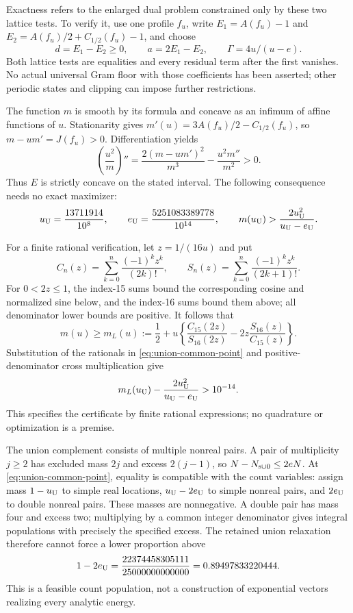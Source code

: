 \documentclass[11pt,reqno]{amsart}
\numberwithin{equation}{section}
\begin{document}
Exactness refers to the enlarged dual problem constrained only
by these two lattice tests. To verify it, use one profile $f_u$,
write $E_1=A(f_u)-1$ and
$E_2=A(f_u)/2+C_{1/2}(f_u)-1$, and choose
\[
 d=E_1-E_2\ge0,\qquad a=2E_1-E_2,\qquad
 \Gamma=4u/(u-e).
\]
Both lattice tests are equalities and every residual term after
the first vanishes. No actual universal Gram floor with those
coefficients has been asserted; other periodic states and
clipping can impose further restrictions.

The function $m$ is smooth by its formula and concave as an
infimum of affine functions of $u$. Stationarity gives
$m'(u)=3A(f_u)/2-C_{1/2}(f_u)$, so $m-u m'=J(f_u)>0$.
Differentiation yields
\[
 \left(\frac{u^2}{m}\right)''
 =\frac{2(m-u m')^2}{m^3}-\frac{u^2m''}{m^2}>0.
\]
Thus $E$ is strictly concave on the stated interval.
The following consequence needs no exact maximizer:
\begin{equation}
 u_{\rm U}=\frac{13711914}{10^8},\qquad
 e_{\rm U}=\frac{5251083389778}{10^{14}},\qquad
 m(u_{\rm U})>\frac{2u_{\rm U}^2}{u_{\rm U}-e_{\rm U}}.
 \label{eq:union-common-point}
\end{equation}

For a finite rational verification, let $z=1/(16u)$ and put
\[
 C_n(z)=\sum_{k=0}^n\frac{(-1)^kz^k}{(2k)!},\qquad
 S_n(z)=\sum_{k=0}^n\frac{(-1)^kz^k}{(2k+1)!}.
\]
For $0<2z\le1$, the index-15 sums bound the corresponding
cosine and normalized sine below, and the index-16 sums bound
them above; all denominator lower bounds are positive.
It follows that
\[
 m(u)\ge m_L(u):=\frac12+
 u\left\{\frac{C_{15}(2z)}{S_{16}(2z)}
             -2z\frac{S_{16}(z)}{C_{15}(z)}\right\}.
\]
Substitution of the rationals in \eqref{eq:union-common-point}
and positive-denominator cross multiplication give
\[
 m_L(u_{\rm U})
 -\frac{2u_{\rm U}^2}{u_{\rm U}-e_{\rm U}}>10^{-14}.
\]
This specifies the certificate by finite rational expressions;
no quadrature or optimization is a premise.

The union complement consists of multiple nonreal pairs.
A pair of multiplicity $j\ge2$ has excluded mass $2j$
and excess $2(j-1)$, so $N-N_{\rm s\cup0}\le2eN$.
At \eqref{eq:union-common-point}, equality is compatible with
the count variables: assign mass $1-u_{\rm U}$ to simple real
locations, $u_{\rm U}-2e_{\rm U}$ to simple nonreal pairs, and
$2e_{\rm U}$ to double nonreal pairs. These masses are
nonnegative. A double pair has mass four and excess two;
multiplying by a common integer denominator gives integral
populations with precisely the specified excess. The retained
union relaxation therefore cannot force a lower proportion above
\begin{equation}
 1-2e_{\rm U}
 =\frac{22374458305111}{25000000000000}
 =0.89497833220444.
 \label{eq:union-method-ceiling}
\end{equation}
This is a feasible count population, not a construction of
exponential vectors realizing every analytic energy.
\end{document}
